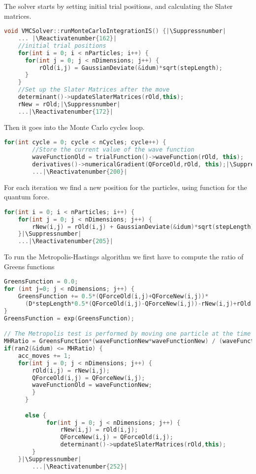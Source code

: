 		The solver starts by setting initial trial positions, and calculating the Slater matrices. 
\begin{lstlisting}[language=C++, firstnumber=134]
	void VMCSolver::runMonteCarloIntegrationIS() {|\Suppressnumber|
	... |\Reactivatenumber{162}|
	//initial trial positions
	for(int i = 0; i < nParticles; i++) {
	  for(int j = 0; j < nDimensions; j++) {
	      rOld(i,j) = GaussianDeviate(&idum)*sqrt(stepLength);
	  }
	}
	//Set up the Slater Matrices after the move
	determinant()->updateSlaterMatrices(rOld,this);
	rNew = rOld;|\Suppressnumber|
	...|\Reactivatenumber{172}|
\end{lstlisting}
		Then it goes into the Monte Carlo cycles loop.
\begin{lstlisting}[language=C++, firstnumber=175]
	for(int cycle = 0; cycle < nCycles; cycle++) {
		//Store the current value of the wave function
     	waveFunctionOld = trialFunction()->waveFunction(rOld, this);
     	derivatives()->numericalGradient(QForceOld,rOld, this);|\Suppressnumber|
		...|\Reactivatenumber{200}|
\end{lstlisting}
		For each iteration we find a new position for the particles, using function for the quantum force.
\begin{lstlisting}[language=C++, firstnumber=200]
for(int i = 0; i < nParticles; i++) {
	for(int j = 0; j < nDimensions; j++) {
	    rNew(i,j) = rOld(i,j) + GaussianDeviate(&idum)*sqrt(stepLength)+QForceOld(i,j)*stepLength*D;
	}|\Suppressnumber|
	...|\Reactivatenumber{205}|
\end{lstlisting}
		To run the Metropolis-Hastings algorithm we first have to compute the ratio of Greens functions
\begin{lstlisting}[language=C++, firstnumber=224]
GreensFunction = 0.0;
for (int j=0; j < nDimensions; j++) {
    GreensFunction += 0.5*(QForceOld(i,j)+QForceNew(i,j))*
      (D*stepLength*0.5*(QForceOld(i,j)-QForceNew(i,j))-rNew(i,j)+rOld(i,j));
}
GreensFunction = exp(GreensFunction);

// The Metropolis test is performed by moving one particle at the time
MHRatio = GreensFunction*(waveFunctionNew*waveFunctionNew) / (waveFunctionOld*waveFunctionOld);
if(ran2(&idum) <= MHRatio) {
    acc_moves += 1;
    for(int j = 0; j < nDimensions; j++) {
        rOld(i,j) = rNew(i,j);
        QForceOld(i,j) = QForceNew(i,j);
        waveFunctionOld = waveFunctionNew;
       	}
      }

      else {
			for(int j = 0; j < nDimensions; j++) {
				rNew(i,j) = rOld(i,j);
				QForceNew(i,j) = QForceOld(i,j);
				determinant()->updateSlaterMatrices(rOld,this);
   		}
   	}|\Suppressnumber|
		...|\Reactivatenumber{252}|
\end{lstlisting}

